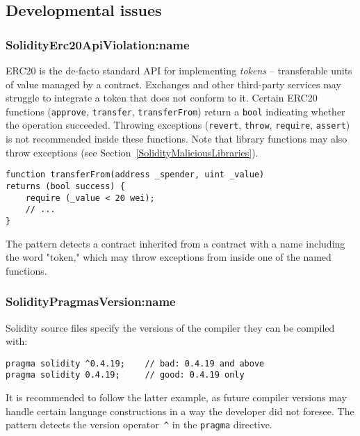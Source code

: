 \subsection{Developmental issues} \label{sec:DevelopmentalIssues}

\subsubsection{\usevalue SolidityErc20ApiViolation:name } \label{SolidityErc20ApiViolation}

ERC20 is the de-facto standard API for implementing \textit{tokens} -- transferable units of value managed by a contract.
Exchanges and other third-party services may struggle to integrate a token that does not conform to it.
Certain ERC20 functions (\texttt{approve}, \texttt{transfer}, \texttt{transferFrom}) return a \texttt{bool} indicating whether the operation succeeded.
Throwing exceptions (\texttt{revert}, \texttt{throw}, \texttt{require}, \texttt{assert}) is not recommended inside these functions.
Note that library functions may also throw exceptions (see Section~\ref{SolidityMaliciousLibraries}).

\begin{lstlisting}[language=Solidity]
function transferFrom(address _spender, uint _value)
returns (bool success) {
	require (_value < 20 wei);
	// ...
}
\end{lstlisting}

The pattern detects a contract inherited from a contract with a name including the word "token," which may throw exceptions from inside one of the named functions.

\subsubsection{\usevalue SolidityPragmasVersion:name } \label{SolidityPragmasVersion}

Solidity source files specify the versions of the compiler they can be compiled with:
\begin{lstlisting}[language=Solidity]
pragma solidity ^0.4.19;	// bad: 0.4.19 and above
pragma solidity 0.4.19;		// good: 0.4.19 only
\end{lstlisting}
It is recommended to follow the latter example, as future compiler versions may handle certain language constructions in a way the developer did not foresee.
The pattern detects the version operator~\texttt{\^{}} in the \texttt{pragma} directive.

